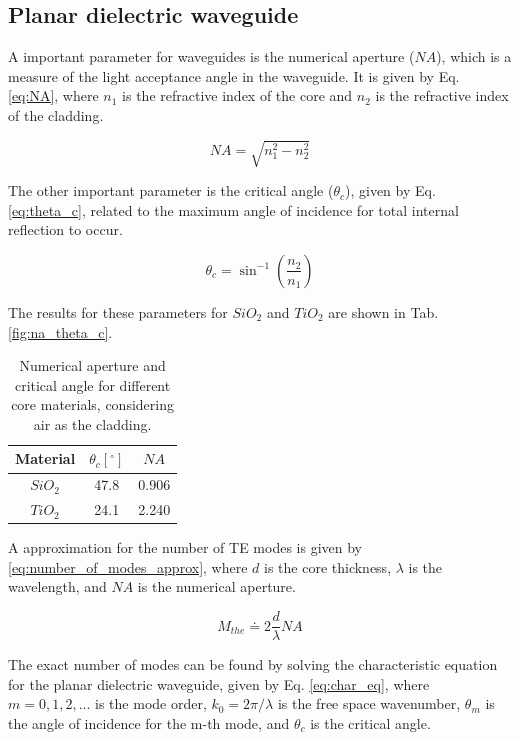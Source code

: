 \documentclass[a4paper,12pt]{article}
\begin{document}
\subsection{Planar dielectric waveguide}
\label{subsec:planar_dielectric_waveguide}

A important parameter for waveguides is the numerical aperture ($NA$), which is a measure of the light acceptance angle in the waveguide. It is given by Eq. \ref{eq:NA}, where $n_1$ is the refractive index of the core and $n_2$ is the refractive index of the cladding. 

\begin{equation}
    NA = \sqrt{n_1^2 - n_2^2} 
    \label{eq:NA}
\end{equation}

The other important parameter is the critical angle ($\theta_c$), given by Eq. \ref{eq:theta_c}, related to the maximum angle of incidence for total internal reflection to occur.

\begin{equation}
    \theta_c = \sin^{-1} \left(\frac{n_2}{n_1}\right) 
    \label{eq:theta_c}
\end{equation}

The results for these parameters for $SiO_2$ and $TiO_2$ are shown in Tab. \ref{fig:na_theta_c}.

\begin{table}[H]
    \centering
    \begin{tabular}{ccc}
        \toprule
        Material & $\theta_c [^\circ]$ & $NA$ \\
        \midrule
        $SiO_2$ & 47.8 & 0.906 \\
        $TiO_2$ & 24.1 & 2.240 \\
        \bottomrule
    \end{tabular}
    \caption{Numerical aperture and critical angle for different core materials, considering air as the cladding.}
    \label{tab:na_theta_c}
\end{table}

A approximation for the number of TE modes is given by \eqref{eq:number_of_modes_approx}, where $d$ is the core thickness, $\lambda$ is the wavelength, and $NA$ is the numerical aperture. 

\begin{equation}
    M_{the} \doteq 2 \frac{d}{\lambda} NA
    \label{eq:number_of_modes_approx}
\end{equation}

The exact number of modes can be found by solving the characteristic equation for the planar dielectric waveguide, given by Eq. \ref{eq:char_eq}, where $m = 0, 1, 2, ...$ is the mode order, $k_0 = 2 \pi / \lambda$ is the free space wavenumber, $\theta_m$ is the angle of incidence for the m-th mode, and $\theta_c$ is the critical angle.
\end{document}
